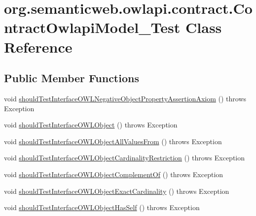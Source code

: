 \hypertarget{classorg_1_1semanticweb_1_1owlapi_1_1contract_1_1_contract_owlapi_model__3_test}{\section{org.\-semanticweb.\-owlapi.\-contract.\-Contract\-Owlapi\-Model\-\_\-Test Class Reference}
\label{classorg_1_1semanticweb_1_1owlapi_1_1contract_1_1_contract_owlapi_model__3_test}
}
\subsection*{Public Member Functions}
\begin{DoxyCompactItemize}
\item 
void \hyperlink{classorg_1_1semanticweb_1_1owlapi_1_1contract_1_1_contract_owlapi_model__3_test_a984b2a623aaad2c95bfbbacd1691f98d}{should\-Test\-Interface\-O\-W\-L\-Negative\-Object\-Property\-Assertion\-Axiom} ()  throws Exception 
\item 
void \hyperlink{classorg_1_1semanticweb_1_1owlapi_1_1contract_1_1_contract_owlapi_model__3_test_a9bc105590eecd2c1dc8bbfbb80c73ba4}{should\-Test\-Interface\-O\-W\-L\-Object} ()  throws Exception 
\item 
void \hyperlink{classorg_1_1semanticweb_1_1owlapi_1_1contract_1_1_contract_owlapi_model__3_test_a19f1df7993d290d52f7aff6e38213e16}{should\-Test\-Interface\-O\-W\-L\-Object\-All\-Values\-From} ()  throws Exception 
\item 
void \hyperlink{classorg_1_1semanticweb_1_1owlapi_1_1contract_1_1_contract_owlapi_model__3_test_a8a079aa3bc5f63309e4a10b35330f2b5}{should\-Test\-Interface\-O\-W\-L\-Object\-Cardinality\-Restriction} ()  throws Exception 
\item 
void \hyperlink{classorg_1_1semanticweb_1_1owlapi_1_1contract_1_1_contract_owlapi_model__3_test_a09f0c8b3bab6207c9e9b27dad27e4e61}{should\-Test\-Interface\-O\-W\-L\-Object\-Complement\-Of} ()  throws Exception 
\item 
void \hyperlink{classorg_1_1semanticweb_1_1owlapi_1_1contract_1_1_contract_owlapi_model__3_test_afc10258cc3273eef003bca20d7badfc2}{should\-Test\-Interface\-O\-W\-L\-Object\-Exact\-Cardinality} ()  throws Exception 
\item 
void \hyperlink{classorg_1_1semanticweb_1_1owlapi_1_1contract_1_1_contract_owlapi_model__3_test_aa95df669b3d0ac31d2efb08c430027b6}{should\-Test\-Interface\-O\-W\-L\-Object\-Has\-Self} ()  throws Exception 

\end{DoxyCompactItemize}
